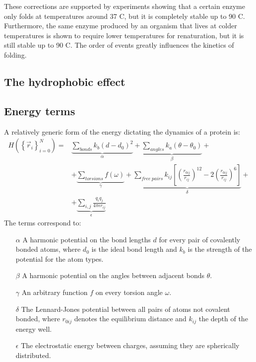 These corrections are supported by experiments showing that a certain enzyme only folds at temperatures around 37 C, but it is completely stable up to 90 C.
Furthermore, the same enzyme produced by an organism that lives at colder temperatures is shown to require lower temperatures for renaturation, but it is still stable up to 90 C.
The order of events greatly influences the kinetics of folding.

\FloatBarrier
\subsection{The hydrophobic effect}

\subsection{Energy terms}
A relatively generic form of the energy dictating the dynamics of a protein is:
\begin{align*}
H(\left\{\vec r_i\right\}_{i=0}^N) =& \underbrace{\sum_{bonds} k_b \left(d - d_0\right)^2}_\alpha + 
\underbrace{\sum_{angles} k_a \left(\theta - \theta_0\right)}_\beta +  \nonumber \\
&+ \underbrace{\sum_{torsions} f\left(\omega\right)}_\gamma +
\underbrace{\sum_{free\ pairs} k_{ij} \left[\left(\frac{r_{0ij}}{r_{ij}}\right)^{12} - 2 \left(\frac{r_{0ij}}{r_{ij}}\right)^{6} \right]}_\delta + \nonumber \\
&+ \underbrace{\sum_{i,j} \frac{q_i q_j}{4 \pi \epsilon r_{ij}}}_\epsilon
\end{align*}
The terms correspond to:

\begin{itemize}
\item[$\alpha$] A harmonic potential on the bond lengths $d$ for every pair of covalently bonded atoms, where $d_0$ is the ideal bond length and $k_b$ is the strength of the potential for the atom types.
\item[$\beta$] A harmonic potential on the angles between adjacent bonds $\theta$.
\item[$\gamma$] An arbitrary function $f$ on every torsion angle $\omega$.
\item[$\delta$] The Lennard-Jones potential between all pairs of atoms not covalent bonded, where $r_{0ij}$ denotes the equilibrium distance and $k_{ij}$ the depth of the energy well.
\item[$\epsilon$] The electrostatic energy between charges, assuming they are spherically distributed.
\end{itemize}

